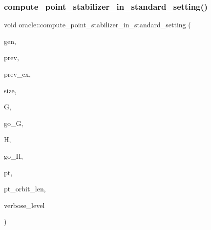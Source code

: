 \subsubsection{\texorpdfstring{compute\+\_\+point\+\_\+stabilizer\+\_\+in\+\_\+standard\+\_\+setting()}{compute\_point\_stabilizer\_in\_standard\_setting()}}
{\footnotesize\ttfamily void oracle\+::compute\+\_\+point\+\_\+stabilizer\+\_\+in\+\_\+standard\+\_\+setting (\begin{DoxyParamCaption}\item[{\mbox{\hyperlink{classgenerator}{generator}} $\ast$}]{gen,  }\item[{\mbox{\hyperlink{galois_8h_a09fddde158a3a20bd2dcadb609de11dc}{I\+NT}}}]{prev,  }\item[{\mbox{\hyperlink{galois_8h_a09fddde158a3a20bd2dcadb609de11dc}{I\+NT}}}]{prev\+\_\+ex,  }\item[{\mbox{\hyperlink{galois_8h_a09fddde158a3a20bd2dcadb609de11dc}{I\+NT}}}]{size,  }\item[{\mbox{\hyperlink{classgroup}{group}} \&}]{G,  }\item[{\mbox{\hyperlink{classlonginteger__object}{longinteger\+\_\+object}} \&}]{go\+\_\+G,  }\item[{\mbox{\hyperlink{classgroup}{group}} \&}]{H,  }\item[{\mbox{\hyperlink{classlonginteger__object}{longinteger\+\_\+object}} \&}]{go\+\_\+H,  }\item[{\mbox{\hyperlink{galois_8h_a09fddde158a3a20bd2dcadb609de11dc}{I\+NT}}}]{pt,  }\item[{\mbox{\hyperlink{galois_8h_a09fddde158a3a20bd2dcadb609de11dc}{I\+NT}}}]{pt\+\_\+orbit\+\_\+len,  }\item[{\mbox{\hyperlink{galois_8h_a09fddde158a3a20bd2dcadb609de11dc}{I\+NT}}}]{verbose\+\_\+level }\end{DoxyParamCaption})}

\mbox{\label{classoracle_ac88b56b30c84a4b5cd9b75869d468025}} 
